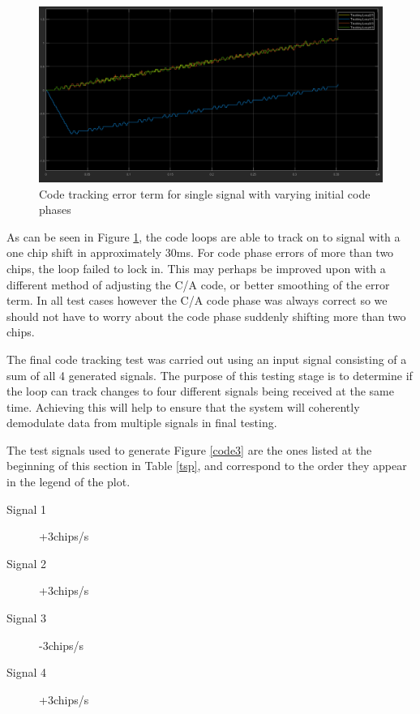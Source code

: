 \documentclass[11pt]{article}
\numberwithin{equation}{subsection}
\begin{document}
	\begin{figure}
		\centering
		\label{Code_Tracking_Test_2}
		\includegraphics[width=\textwidth]{Code_Tracking_Test_2}
		\caption{Code tracking error term for single signal with varying initial code phases}
		\label{code2}
	\end{figure}
	\FloatBarrier
	As can be seen in Figure \ref{code2}, the code loops are able to track on to signal with a one chip shift in approximately 30ms. For code phase errors of more than two chips, the loop failed to lock in. This may perhaps be improved upon with a different method of adjusting the C/A code, or better smoothing of the error term. In all test cases however the C/A code phase was always correct so we should not have to worry about the code phase suddenly shifting more than two chips.  
	
	
	The final code tracking test was carried out using an input signal consisting of a sum of all 4 generated signals. The purpose of this testing stage is to determine if the loop can track changes to four different signals being received at the same time. Achieving this will help to ensure that the system will coherently demodulate data from multiple signals in final testing.
	
	The test signals used to generate Figure \ref{code3} are the ones listed at the beginning of this section in Table \ref{tsp}, and correspond to the order they appear in the legend of the plot.
	
	\begin{description}
		\item[Signal 1]{ +3chips/s}
		
		\item[Signal 2]{ +3chips/s}
		
		\item[Signal 3]{-3chips/s}
		
		\item[Signal 4]{+3chips/s}
	\end{description}
	
\end{document}
